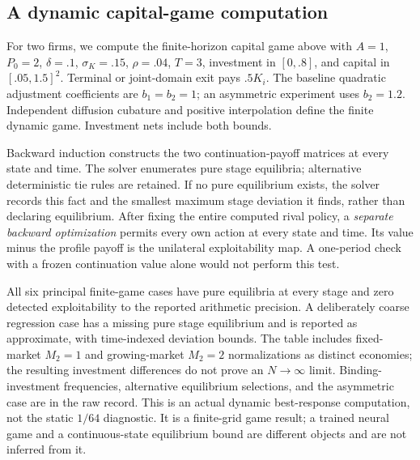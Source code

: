 \subsection{A dynamic capital-game computation}\label{sec:dynamic-computation-r6-history}
For two firms, we compute the finite-horizon capital game above with $A=1$, $P_0=2$, $\delta=.1$, $\sigma_K=.15$, $\rho=.04$, $T=3$, investment in $[0,.8]$, and capital in $[.05,1.5]^2$. Terminal or joint-domain exit pays $.5K_i$. The baseline quadratic adjustment coefficients are $b_1=b_2=1$; an asymmetric experiment uses $b_2=1.2$. Independent diffusion cubature and positive interpolation define the finite dynamic game. Investment nets include both bounds.

Backward induction constructs the two continuation-payoff matrices at every state and time. The solver enumerates pure stage equilibria; alternative deterministic tie rules are retained. If no pure equilibrium exists, the solver records this fact and the smallest maximum stage deviation it finds, rather than declaring equilibrium. After fixing the entire computed rival policy, a \emph{separate backward optimization} permits every own action at every state and time. Its value minus the profile payoff is the unilateral exploitability map. A one-period check with a frozen continuation value alone would not perform this test.

All six principal finite-game cases have pure equilibria at every stage and zero detected exploitability to the reported arithmetic precision. A deliberately coarse regression case has a missing pure stage equilibrium and is reported as approximate, with time-indexed deviation bounds. The table includes fixed-market $M_2=1$ and growing-market $M_2=2$ normalizations as distinct economies; the resulting investment differences do not prove an $N\to\infty$ limit. Binding-investment frequencies, alternative equilibrium selections, and the asymmetric case are in the raw record. This is an actual dynamic best-response computation, not the static $1/64$ diagnostic. It is a finite-grid game result; a trained neural game and a continuous-state equilibrium bound are different objects and are not inferred from it.
